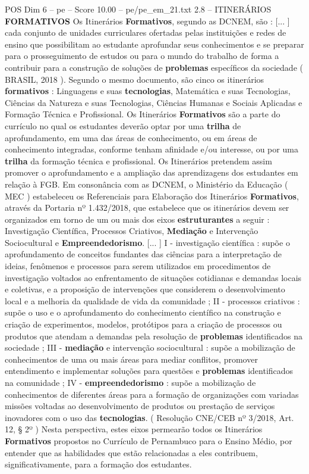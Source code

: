 \begin{textsample}{POS Dim 6 – pe – Score 10.00 – pe/pe\_em\_21.txt}  \label{ex:f6_pos_251}
2.8 – ITINERÁRIOS \textbf{FORMATIVOS} Os Itinerários \textbf{Formativos}, segundo as DCNEM, são : [... ] cada conjunto de unidades curriculares ofertadas pelas instituições e redes de ensino que possibilitam ao estudante aprofundar seus conhecimentos e se preparar para o prosseguimento de estudos ou para o mundo do trabalho de forma a contribuir para a construção de soluções de \textbf{problemas} específicos da sociedade ( BRASIL, 2018 ).
Segundo o mesmo documento, são cinco os itinerários \textbf{formativos} : Linguagens e suas \textbf{tecnologias}, Matemática e suas Tecnologias, Ciências da Natureza e suas Tecnologias, Ciências Humanas e Sociais Aplicadas e Formação Técnica e Profissional.
Os Itinerários \textbf{Formativos} são a parte do currículo no qual os estudantes deverão optar por uma \textbf{trilha} de aprofundamento, em uma das áreas de conhecimento, ou em áreas de conhecimento integradas, conforme tenham afinidade e/ou interesse, ou por uma \textbf{trilha} da formação técnica e profissional.
Os Itinerários pretendem assim promover o aprofundamento e a ampliação das aprendizagens dos estudantes em relação à FGB.
Em consonância com as DCNEM, o Ministério da Educação ( MEC ) estabeleceu os Referenciais para Elaboração dos Itinerários \textbf{Formativos}, através da Portaria nº 1.432/2018, que estabelece que os itinerários devem ser organizados em torno de um ou mais dos eixos \textbf{estruturantes} a seguir : Investigação Científica, Processos Criativos, \textbf{Mediação} e Intervenção Sociocultural e \textbf{Empreendedorismo}. [... ] I - investigação científica : supõe o aprofundamento de conceitos fundantes das ciências para a interpretação de ideias, fenômenos e processos para serem utilizados em procedimentos de investigação voltados ao enfrentamento de situações cotidianas e demandas locais e coletivas, e a proposição de intervenções que considerem o desenvolvimento local e a melhoria da qualidade de vida da comunidade ; II - processos criativos : supõe o uso e o aprofundamento do conhecimento científico na construção e criação de experimentos, modelos, protótipos para a criação de processos ou produtos que atendam a demandas pela resolução de \textbf{problemas} identificados na sociedade ; III - \textbf{mediação} e intervenção sociocultural : supõe a mobilização de conhecimentos de uma ou mais áreas para mediar conflitos, promover entendimento e implementar soluções para questões e \textbf{problemas} identificados na comunidade ; IV - \textbf{empreendedorismo} : supõe a mobilização de conhecimentos de diferentes áreas para a formação de organizações com variadas missões voltadas ao desenvolvimento de produtos ou prestação de serviços inovadores com o uso das \textbf{tecnologias}. ( Resolução CNE/CEB nº 3/2018, Art. 12, § 2º ) Nesta perspectiva, estes eixos permearão todos os Itinerários \textbf{Formativos} propostos no Currículo de Pernambuco para o Ensino Médio, por entender que as habilidades que estão relacionadas a eles contribuem, significativamente, para a formação dos estudantes.

\end{textsample}
